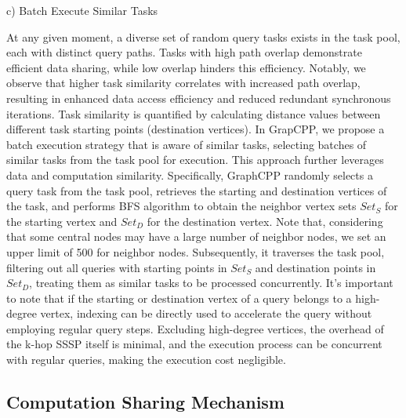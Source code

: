 \documentclass[lettersize,journal]{IEEEtran} %
\begin{document}
c) Batch Execute Similar Tasks

At any given moment, a diverse set of random query tasks exists in the task pool, each with distinct query paths. Tasks with high path overlap demonstrate efficient data sharing, while low overlap hinders this efficiency. Notably, we observe that higher task similarity correlates with increased path overlap, resulting in enhanced data access efficiency and reduced redundant synchronous iterations. Task similarity is quantified by calculating distance values between different task starting points (destination vertices). In GrapCPP, we propose a batch execution strategy that is aware of similar tasks, selecting batches of similar tasks from the task pool for execution. This approach further leverages data and computation similarity. Specifically, GraphCPP randomly selects a query task from the task pool, retrieves the starting and destination vertices of the task, and performs BFS algorithm to obtain the neighbor vertex sets $Set_S$ for the starting vertex and $Set_D$ for the destination vertex. Note that, considering that some central nodes may have a large number of neighbor nodes, we set an upper limit of 500 for neighbor nodes. Subsequently, it traverses the task pool, filtering out all queries with starting points in $Set_S$ and destination points in $Set_D$, treating them as similar tasks to be processed concurrently. It's important to note that if the starting or destination vertex of a query belongs to a high-degree vertex, indexing can be directly used to accelerate the query without employing regular query steps. Excluding high-degree vertices, the overhead of the k-hop SSSP itself is minimal, and the execution process can be concurrent with regular queries, making the execution cost negligible.


\subsection{Computation Sharing Mechanism}
\end{document}

